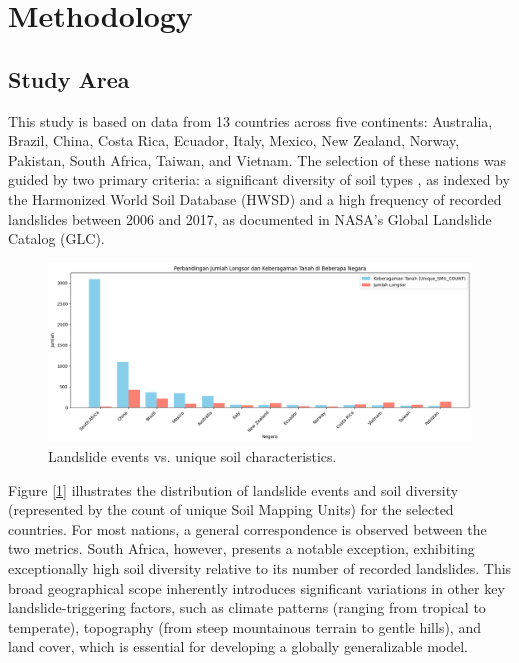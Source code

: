 \section{Methodology}

\subsection{Study Area}
This study is based on data from 13 countries across five continents: Australia, Brazil, China, Costa Rica, Ecuador, Italy, Mexico, New Zealand, Norway, Pakistan, South Africa, Taiwan, and Vietnam. The selection of these nations was guided by two primary criteria: a significant diversity of soil types , as indexed by the Harmonized World Soil Database (HWSD) and a high frequency of recorded landslides between 2006 and 2017, as documented in NASA's Global Landslide Catalog (GLC).
\begin{figure}[htbp]
    \centerline{\includegraphics[width=\linewidth]{fig1.png}}
    \caption{Landslide events vs. unique soil characteristics.}
    \label{fig:landslide-soil-distribution}
\end{figure}
Figure [\ref{fig:landslide-soil-distribution}] illustrates the distribution of landslide events and soil diversity (represented by the count of unique Soil Mapping Units) for the selected countries. For most nations, a general correspondence is observed between the two metrics. South Africa, however, presents a notable exception, exhibiting exceptionally high soil diversity relative to its number of recorded landslides. This broad geographical scope inherently introduces significant variations in other key landslide-triggering factors, such as climate patterns (ranging from tropical to temperate), topography (from steep mountainous terrain to gentle hills), and land cover, which is essential for developing a globally generalizable model.


